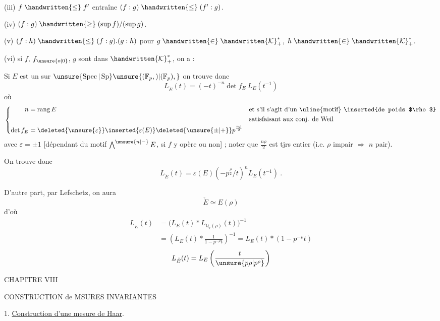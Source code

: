 (iii) \quad $f\mathrel{\handwritten{\leq}} f'$ entraîne $(f:g)\mathrel{\handwritten{\leq}}(f':g)$.

(iv) \quad $(f:g)\mathrel{\handwritten{\geq}}(\sup f)/(\sup g)$.

(v) \quad $(f:h)\mathrel{\handwritten{\leq}}(f:g).(g:h)$ pour $g\mathrel{\handwritten{\in}}\handwritten{\mathcal{K}}^{\ast}_{+}$, $h\mathrel{\handwritten{\in}}\handwritten{\mathcal{K}}^{\ast}_{+}$.

(vi) \quad si $f$, $f_{\unsure{o|0}}$, $g$ sont dans $\handwritten{\mathcal{K}}^{\ast}_{+}$, on a :

Si $E$ est un  sur $\unsure{\operatorname{Spec}|\operatorname{Sp}}\unsure{(\mathbb{F}_p,)|(\mathbb{F}_p),}$  on trouve donc
\[
L_{\check E}(t)=(-t)^{-n}\det f_E\ L_E(t^{-1})
\]
où
\[
\left\{\begin{aligned}
n&=\operatorname{rang} E
  &&\text{et s'il s'agit d'un \uline{motif} \inserted{de poids $\rho$}}\\
 &&&\text{satisfaisant aux conj. de Weil}\\
\det f_E&=\deleted{\unsure{\varepsilon}}\inserted{\varepsilon(E)}\deleted{\unsure{\pm|+}}p^{\frac{n\rho}{2}}
\end{aligned}\right.
\]
avec $\varepsilon=\pm1$ [dépendant du motif $\bigwedge^{\unsure{n|{-}}}E$,  si $f$ y opère  ou non] ; noter que $\frac{n\rho}{2}$ est tjrs entier (i.e. $\rho$ impair $\Longrightarrow$ $n$ pair).

On trouve donc
\[
L_{\check E}(t)=\varepsilon(E)(-p^{\frac{\rho}{2}}/t)^n L_E(t^{-1})\ .
\]

D'autre part, par Lefschetz, on aura
\[
\check E\simeq E(\rho)
\]
d'où
\[
\begin{aligned}
L_{\check E}(t)&=\bigl(L_E(t)\ast L_{\mathbb{Q}_{\ell}(\rho)}(t)\bigr)^{-1}\\
&=\left(L_E(t)\ast\frac{1}{1-p^{-\rho}t}\right)^{-1}=L_E(t)\ast(1-p^{-\rho}t)
\end{aligned}
\]
\[
L_{\check E}(t)=L_E\left(\frac{t}{\unsure{p\rho|p^\rho}}\right)
\]

CHAPITRE VIII

CONSTRUCTION de MSURES INVARIANTES

\handwritten{\S} 1. \uline{Construction d'une mesure de Haar}.

